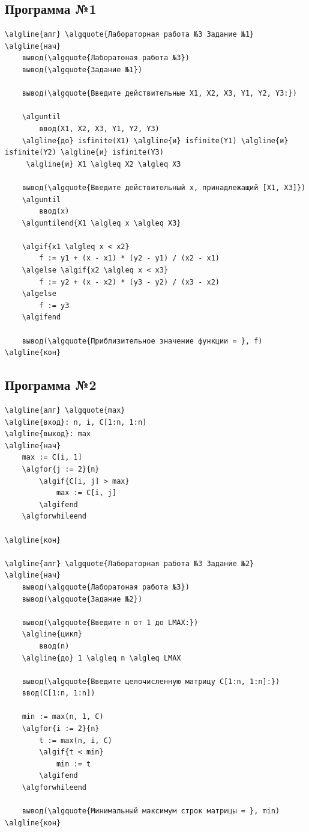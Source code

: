 \subsection{Программа №1}
\begin{Verbatim}[commandchars=\\\{\}]
\algline{алг} \algquote{Лабораторная работа №3 Задание №1}
\algline{нач}
    вывод(\algquote{Лаборатоная работа №3})
    вывод(\algquote{Задание №1})

    вывод(\algquote{Введите действительные X1, X2, X3, Y1, Y2, Y3:})

    \alguntil
        ввод(X1, X2, X3, Y1, Y2, Y3)
    \algline{до} isfinite(X1) \algline{и} isfinite(Y1) \algline{и} isfinite(Y2) \algline{и} isfinite(Y3)
     \algline{и} X1 \algleq X2 \algleq X3

    вывод(\algquote{Введите действительный x, принадлежащий [X1, X3]})
    \alguntil
        ввод(x)
    \alguntilend{X1 \algleq x \algleq X3}

    \algif{x1 \algleq x < x2}
        f := y1 + (x - x1) * (y2 - y1) / (x2 - x1)
    \algelse \algif{x2 \algleq x < x3}
        f := y2 + (x - x2) * (y3 - y2) / (x3 - x2)
    \algelse
        f := y3
    \algifend

    вывод(\algquote{Приблизительное значение функции = }, f)
\algline{кон}
\end{Verbatim}

\subsection{Программа №2}
\begin{Verbatim}[commandchars=\\\{\}]
\algline{алг} \algquote{max}
\algline{вход}: n, i, C[1:n, 1:n]
\algline{выход}: max
\algline{нач}
    max := C[i, 1]
    \algfor{j := 2}{n}
        \algif{C[i, j] > max}
            max := C[i, j]
        \algifend
    \algforwhileend

\algline{кон}

\algline{алг} \algquote{Лабораторная работа №3 Задание №2}
\algline{нач}
    вывод(\algquote{Лаборатоная работа №3})
    вывод(\algquote{Задание №2})

    вывод(\algquote{Введите n от 1 до LMAX:})
    \algline{цикл}
        ввод(n)
    \algline{до} 1 \algleq n \algleq LMAX

    вывод(\algquote{Введите целочисленную матрицу C[1:n, 1:n]:})
    ввод(C[1:n, 1:n])

    min := max(n, 1, C)
    \algfor{i := 2}{n}
        t := max(n, i, C)
        \algif{t < min}
            min := t
        \algifend
    \algforwhileend

    вывод(\algquote{Минимальный максимум строк матрицы = }, min)
\algline{кон}
\end{Verbatim}

